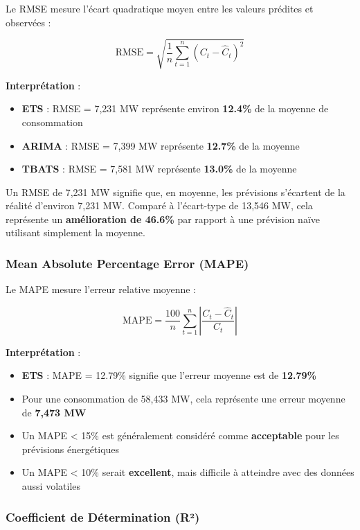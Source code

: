 \documentclass[12pt,a4paper]{article}
\begin{document}
Le RMSE mesure l'écart quadratique moyen entre les valeurs prédites et observées :

\begin{equation}
    \text{RMSE} = \sqrt{\frac{1}{n}\sum_{t=1}^{n}(C_t - \hat{C}_t)^2}
\end{equation}

\textbf{Interprétation} :
\begin{itemize}
    \item \textbf{ETS} : RMSE = 7,231 MW représente environ \textbf{12.4\%} de la moyenne de consommation
    \item \textbf{ARIMA} : RMSE = 7,399 MW représente \textbf{12.7\%} de la moyenne
    \item \textbf{TBATS} : RMSE = 7,581 MW représente \textbf{13.0\%} de la moyenne
\end{itemize}

Un RMSE de 7,231 MW signifie que, en moyenne, les prévisions s'écartent de la réalité d'environ 7,231 MW. Comparé à l'écart-type de 13,546 MW, cela représente un \textbf{amélioration de 46.6\%} par rapport à une prévision naïve utilisant simplement la moyenne.

\subsubsection{Mean Absolute Percentage Error (MAPE)}

Le MAPE mesure l'erreur relative moyenne :

\begin{equation}
    \text{MAPE} = \frac{100}{n}\sum_{t=1}^{n}\left|\frac{C_t - \hat{C}_t}{C_t}\right|
\end{equation}

\textbf{Interprétation} :
\begin{itemize}
    \item \textbf{ETS} : MAPE = 12.79\% signifie que l'erreur moyenne est de \textbf{12.79\%}
    \item Pour une consommation de 58,433 MW, cela représente une erreur moyenne de \textbf{7,473 MW}
    \item Un MAPE < 15\% est généralement considéré comme \textbf{acceptable} pour les prévisions énergétiques
    \item Un MAPE < 10\% serait \textbf{excellent}, mais difficile à atteindre avec des données aussi volatiles
\end{itemize}

\subsubsection{Coefficient de Détermination (R²)}
\end{document}
